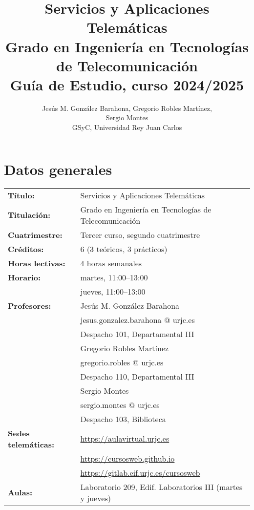 \documentclass[a4paper,12pt]{article}
\title{Servicios y Aplicaciones Telemáticas \\
Grado en Ingeniería en Tecnologías de Telecomunicación \\
Guía de Estudio, curso 2024/2025}
\author{Jesús M. González Barahona, Gregorio Robles Martínez, \\
  Sergio Montes \\
GSyC, Universidad Rey Juan Carlos}
\begin{document}
\maketitle

\tableofcontents

\newpage

\section{Datos generales}

\begin{tabular}{ll}
\textbf{Título:} & Servicios y Aplicaciones Telemáticas \\
\textbf{Titulación:} & Grado en Ingeniería en Tecnologías de Telecomunicación \\
\textbf{Cuatrimestre:} & Tercer curso, segundo cuatrimestre \\
\textbf{Créditos:} & 6 (3 teóricos, 3 prácticos) \\
\textbf{Horas lectivas:} & 4 horas semanales \\
\textbf{Horario:} & martes, 11:00--13:00 \\
                  & jueves, 11:00--13:00 \\
\textbf{Profesores:}
& Jesús M. González Barahona \\
& \hspace{1cm}jesus.gonzalez.barahona @ urjc.es \\
& \hspace{1cm}Despacho 101, Departamental III\\
& Gregorio Robles Martínez \\
& \hspace{1cm}gregorio.robles @ urjc.es \\
& \hspace{1cm}Despacho 110, Departamental III\\
& Sergio Montes\\
& \hspace{1cm}sergio.montes @ urjc.es \\
& \hspace{1cm}Despacho 103, Biblioteca\\
\textbf{Sedes telemáticas:} & \url{https://aulavirtual.urjc.es} \\
                            & \url{https://cursosweb.github.io} \\
                            & \url{https://gitlab.eif.urjc.es/cursosweb} \\
\textbf{Aulas:} & Laboratorio 209, Edif. Laboratorios III (martes y jueves) \\
\end{tabular}
\end{document}
